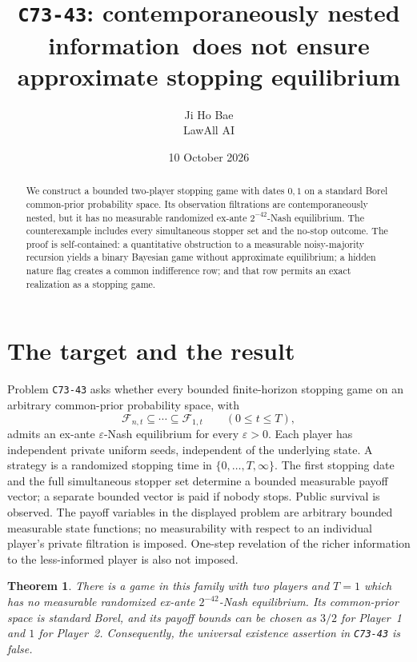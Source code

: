 \documentclass[11pt]{article}
\title{\texttt{C73-43}: contemporaneously nested information\ does not ensure approximate stopping equilibrium}
\author{Ji Ho Bae\\\small LawAll AI}
\date{10 October 2026}
\newtheorem{theorem}{Theorem}
\theoremstyle{remark}
\newcommand{\F}{\mathcal F}
\begin{document}
\maketitle

\begin{abstract}
We construct a bounded two-player stopping game with dates $0,1$ on a
standard Borel common-prior probability space. Its observation filtrations
are contemporaneously nested, but it has no measurable randomized ex-ante
$2^{-42}$-Nash equilibrium. The counterexample includes every simultaneous
stopper set and the no-stop outcome. The proof is self-contained: a
quantitative obstruction to a measurable noisy-majority recursion yields
a binary Bayesian game without approximate equilibrium; a hidden nature
flag creates a common indifference row; and that row permits an exact
realization as a stopping game.
\end{abstract}

\section{The target and the result}

Problem \texttt{C73-43} asks whether every bounded finite-horizon stopping
game on an arbitrary common-prior probability space, with
\[
 \F_{n,t}\subseteq\cdots\subseteq\F_{1,t}\qquad(0\le t\le T),
\]
admits an ex-ante $\varepsilon$-Nash equilibrium for every
$\varepsilon>0$. Each player has independent private uniform seeds,
independent of the underlying state. A strategy is a randomized stopping
time in $\{0,\ldots,T,\infty\}$. The first stopping date and the full
simultaneous stopper set determine a bounded measurable payoff vector;
a separate bounded vector is paid if nobody stops. Public survival is
observed. The payoff variables in the displayed problem are arbitrary
bounded measurable state functions; no measurability with respect to an
individual player's private filtration is imposed. One-step revelation
of the richer information to the less-informed player is also not
imposed.

\begin{theorem}\label{thm:main}
There is a game in this family with two players and
$T=1$ which has no measurable randomized ex-ante $2^{-42}$-Nash
equilibrium. Its common-prior space is standard Borel, and its payoff
bounds can be chosen as $3/2$ for Player~1 and $1$ for Player~2.
Consequently, the universal existence assertion in
\texttt{C73-43} is false.
\end{theorem}
\end{document}
